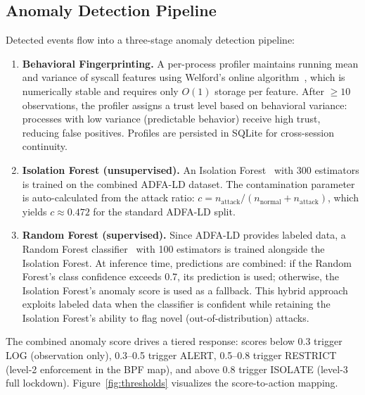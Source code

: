 \documentclass[11pt,letterpaper]{article}
\begin{document}
\subsection{Anomaly Detection Pipeline}

Detected events flow into a three-stage anomaly detection pipeline:

\begin{enumerate}
\item \textbf{Behavioral Fingerprinting.}  A per-process profiler
  maintains running mean and variance of syscall features using
  Welford's online algorithm~\cite{welford1962}, which is numerically
  stable and requires only $O(1)$ storage per feature.  After
  $\geq 10$ observations, the profiler assigns a trust level based on
  behavioral variance: processes with low variance (predictable
  behavior) receive high trust, reducing false positives.  Profiles are
  persisted in SQLite for cross-session continuity.

\item \textbf{Isolation Forest (unsupervised).}  An Isolation
  Forest~\cite{liu2008} with 300 estimators is trained on the combined
  ADFA-LD dataset.  The contamination parameter is auto-calculated from
  the attack ratio:
  $c = n_{\text{attack}} / (n_{\text{normal}} + n_{\text{attack}})$,
  which yields $c \approx 0.472$ for the standard ADFA-LD split.

\item \textbf{Random Forest (supervised).}  Since ADFA-LD provides
  labeled data, a Random Forest classifier~\cite{breiman2001} with 100
  estimators is trained alongside the Isolation Forest.  At inference
  time, predictions are combined: if the Random Forest's class
  confidence exceeds 0.7, its prediction is used; otherwise, the
  Isolation Forest's anomaly score is used as a fallback.  This hybrid
  approach exploits labeled data when the classifier is confident while
  retaining the Isolation Forest's ability to flag novel
  (out-of-distribution) attacks.
\end{enumerate}

The combined anomaly score drives a tiered response: scores below 0.3
trigger LOG (observation only), 0.3--0.5 trigger ALERT, 0.5--0.8
trigger RESTRICT (level-2 enforcement in the BPF map), and above 0.8
trigger ISOLATE (level-3 full lockdown).  Figure~\ref{fig:thresholds}
visualizes the score-to-action mapping.
\end{document}
